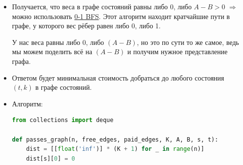 \begin{enumerate}
\begin{itemize}
\begin{itemize}
        \item Копия $0$ (без пропуска) содержит все вершины исходного графа и только бесплатные рёбра (вес $0$)

        \item $k$-ая копия ($k = 1, \ldots, K$, с пропуском типа $k$) содержит все вершины исходного графа и рёбра:
        \begin{itemize}
          \item все бесплатные рёбра (вес $0$)
          \item платные рёбра типа $k$ (вес $0$, так как смена пропуска не требуется)
        \end{itemize}

        \item Добавим рёбра между копиями 0 и $k$, где $k = 1, \ldots, K$:
        \begin{itemize}
          \item $(v, k) \to (v, 0)$ с весом $0$ -- продажа пропуска
          \item $(v, 0) \to (v, k)$ с весом $A - B$ -- покупка пропуска
        \end{itemize}
      \end{itemize}
      
      Смена пропуска $k \to k^*$ идёт через копию $0$: $(v, k) \to (v, 0) \to (v, k^*)$ с суммарным весом $A - B$.

      \item Получается, что веса в графе состояний равны либо $0$, либо $A - B > 0$ $\Rightarrow$ можно использовать \href{https://neerc.ifmo.ru/wiki/index.php?title=%D0%9E%D0%B1%D1%85%D0%BE%D0%B4_%D0%B2_%D1%88%D0%B8%D1%80%D0%B8%D0%BD%D1%83#0-1_BFS}{0-1 BFS}.
      Этот алгоритм находит кратчайшие пути в графе, у которого вес рёбер равен либо 0, либо 1. 
      
      У нас веса равны либо 0, либо $(A-B)$, но это по сути то же самое, ведь мы можем поделить всё на $(A-B)$ и получим нужное представление графа.

      \item Ответом будет минимальная стоимость добраться до любого состояния $(t, k)$ в графе состояний.

      \item Алгоритм:

      \begin{lstlisting}[language=Python]
from collections import deque

def passes_graph(n, free_edges, paid_edges, K, A, B, s, t):
    dist = [[float('inf')] * (K + 1) for _ in range(n)]
    dist[s][0] = 0


\end{lstlisting}
\end{itemize}
\end{enumerate}
